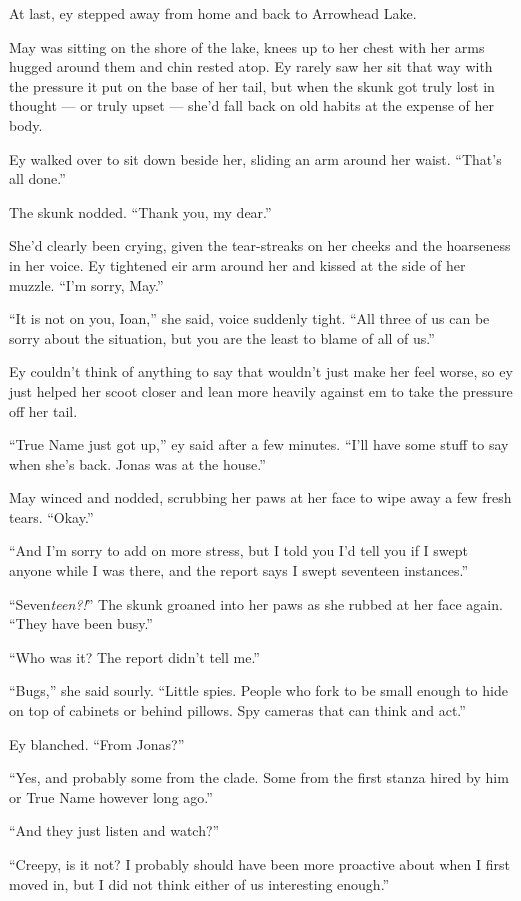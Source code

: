 At last, ey stepped away from home and back to Arrowhead Lake.

May was sitting on the shore of the lake, knees up to her chest with her arms hugged around them and chin rested atop. Ey rarely saw her sit that way with the pressure it put on the base of her tail, but when the skunk got truly lost in thought — or truly upset — she'd fall back on old habits at the expense of her body.

Ey walked over to sit down beside her, sliding an arm around her waist. ``That's all done.''

The skunk nodded. ``Thank you, my dear.''

She'd clearly been crying, given the tear-streaks on her cheeks and the hoarseness in her voice. Ey tightened eir arm around her and kissed at the side of her muzzle. ``I'm sorry, May.''

``It is not on you, Ioan,'' she said, voice suddenly tight. ``All three of us can be sorry about the situation, but you are the least to blame of all of us.''

Ey couldn't think of anything to say that wouldn't just make her feel worse, so ey just helped her scoot closer and lean more heavily against em to take the pressure off her tail.

``True Name just got up,'' ey said after a few minutes. ``I'll have some stuff to say when she's back. Jonas was at the house.''

May winced and nodded, scrubbing her paws at her face to wipe away a few fresh tears. ``Okay.''

``And I'm sorry to add on more stress, but I told you I'd tell you if I swept anyone while I was there, and the report says I swept seventeen instances.''

``Seven\emph{teen?!}'' The skunk groaned into her paws as she rubbed at her face again. ``They have been busy.''

``Who was it? The report didn't tell me.''

``Bugs,'' she said sourly. ``Little spies. People who fork to be small enough to hide on top of cabinets or behind pillows. Spy cameras that can think and act.''

Ey blanched. ``From Jonas?''

``Yes, and probably some from the clade. Some from the first stanza hired by him or True Name however long ago.''

``And they just listen and watch?''

``Creepy, is it not? I probably should have been more proactive about when I first moved in, but I did not think either of us interesting enough.''

